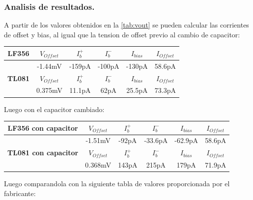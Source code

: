 \subsubsection{Analisis de resultados.}
A partir de los valores obtenidos en la   \ref{tab:vout} se pueden calcular las corrientes de offset y bias, al igual que la tension de offset previo al cambio de capacitor:
\begin{table}[H]
\begin{center}
\begin{tabular}{|c|c|c|c|c|c|}
\hline
\textbf{LF356} & \textbf{$V_{Offset}$} & \textbf{$I_b^+$} & \textbf{$I_b^-$} & \textbf{$I_{bias}$} & \textbf{$I_{Offset}$} \\ \hline
               & -1.44mV                & -159pA           & -100pA           & -130pA               & 58.6pA                 \\ \hline
\textbf{TL081} & \textbf{$V_{Offset}$} & \textbf{$I_b^+$} & \textbf{$I_b^-$} & \textbf{$I_{bias}$} & \textbf{$I_{Offset}$} \\ \hline
\textbf{}      & 0.375mV                & 11.1pA           & 62pA             & 25.5pA               & 73.3pA                 \\ \hline
\end{tabular}
\end{center}
\end{table}
Luego con el capacitor cambiado:
\begin{table}[H]
\begin{center}
\begin{tabular}{|c|c|c|c|c|c|}
\hline
\textbf{LF356 con capacitor} & \textbf{$V_{Offset}$} & \textbf{$I_b^+$} & \textbf{$I_b^-$} & \textbf{$I_{bias}$} & \textbf{$I_{Offset}$} \\ \hline
               & -1.51mV                & -92pA           & -33.6pA           & -62.9pA               & 58.6pA                 \\ \hline
\textbf{TL081 con capacitor} & \textbf{$V_{Offset}$} & \textbf{$I_b^+$} & \textbf{$I_b^-$} & \textbf{$I_{bias}$} & \textbf{$I_{Offset}$} \\ \hline
\textbf{}      & 0.368mV                & 143pA           & 215pA             & 179pA               & 71.9pA                 \\ \hline
\end{tabular}
\end{center}
\end{table}
Luego comparandola con la siguiente tabla de valores proporcionada por el fabricante:
